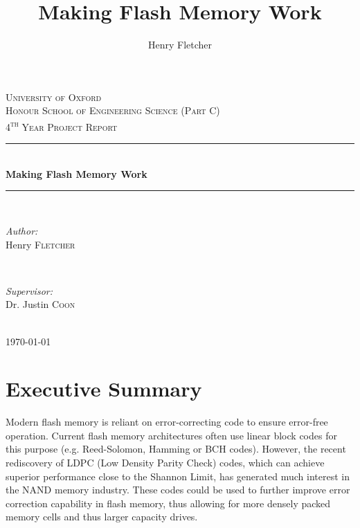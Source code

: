\documentclass[11pt]{article}
\author{Henry Fletcher}
\title{Making Flash Memory Work}
\numberwithin{equation}{subsection}
\begin{document}
\begin{titlepage}

\newcommand{\HRule}{\rule{\linewidth}{0.5mm}}

\center
 
\textsc{\LARGE University of Oxford}\\[1.5cm] 
\textsc{\Large Honour School of Engineering Science (Part C)}\\[0.5cm]
\textsc{\large 4\textsuperscript{th} Year Project Report}\\[0.5cm]
\HRule \\[0.4cm]
{ \huge \bfseries Making Flash Memory Work}\\[0.4cm] %
\HRule \\[1.5cm]
\begin{minipage}{0.4\textwidth}
\begin{flushleft} \large
\emph{Author:}\\
Henry \textsc{Fletcher} %
\end{flushleft}
\end{minipage}
~
\begin{minipage}{0.4\textwidth}
\begin{flushright} \large
\emph{Supervisor:} \\
Dr. Justin \textsc{Coon} %
\end{flushright}
\end{minipage}\\[4cm]

{\large \today}\\[3cm]

\vfill 

\end{titlepage}

\section{Executive Summary}

Modern flash memory is reliant on error-correcting code to ensure error-free operation. Current flash memory architectures often use linear block codes for this purpose (e.g. Reed-Solomon, Hamming or BCH codes). However, the recent rediscovery of LDPC (Low Density Parity Check) codes, which can achieve superior performance close to the Shannon Limit, has generated much interest in the NAND memory industry. These codes could be used to further improve error correction capability in flash memory, thus allowing for more densely packed memory cells and thus larger capacity drives.
\end{document}
